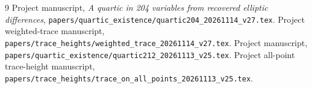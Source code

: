 \documentclass[11pt,a4paper]{article}
\begin{document}
\begin{thebibliography}{9}
 Project manuscript,
\emph{A quartic in 204 variables from recovered elliptic differences},
\nolinkurl{papers/quartic_existence/quartic204_20261114_v27.tex}.
 Project weighted-trace manuscript,
\nolinkurl{papers/trace_heights/weighted_trace_20261114_v27.tex}.
 Project manuscript,
\nolinkurl{papers/quartic_existence/quartic212_20261113_v25.tex}.
 Project all-point trace-height manuscript,
\nolinkurl{papers/trace_heights/trace_on_all_points_20261113_v25.tex}.
\end{thebibliography}
\end{document}
